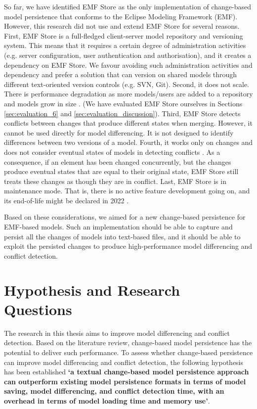 So far, we have identified EMF Store as the only implementation of change-based model persistence that conforms to the Eclipse Modeling Framework (EMF). However, this research did not use and extend EMF Store for several reasons. First, EMF Store is a full-fledged client-server model repository and versioning system. This means that it requires a certain degree of administration activities (e.g. server configuration, user authentication and authorisation), and it creates a dependency on EMF Store. We favour avoiding such administration activities and dependency and prefer a solution that can version on shared models through different text-oriented version controls (e.g. SVN, Git). Second, it does not scale. There is performance degradation as more models/users are added to a repository and models grow in size \cite{KolovosRMPGCLRV13}. (We have evaluated EMF Store ourselves in Sections \ref{sec:evaluation_6} and \ref{sec:evaluation_discussion}). Third, EMF Store detects conflicts between changes that produce different states when merging. However, it cannot be used directly for model differencing. It is not designed to identify differences between two versions of a model. Fourth, it works only on changes and does not consider eventual states of models in detecting conflicts \cite{DBLP:conf/sfm/BroschKLSWW12}. As a consequence, if an element has been changed concurrently, but the changes produce eventual states that are equal to their original state, EMF Store still treats these changes as though they are in conflict. Last, EMF Store is in maintenance mode. That is, there is no active feature development going on, and its end-of-life might be declared in 2022 \cite{emfstore2019what}.

Based on these considerations, we aimed for a new change-based persistence for EMF-based models. Such an implementation should be able to capture and persist all the changes of models into text-based files, and it should be able to exploit the persisted changes to produce high-performance model differencing and conflict detection.

\section{Hypothesis and Research Questions}
\label{sec:research_questions}
The research in this thesis aims to improve model differencing and conflict detection. Based on the literature review, change-based model persistence has the potential to deliver such performance. To assess whether change-based persistence can improve model differencing and conflict detection, the following hypothesis has been established \textbf{‘a textual change-based model persistence approach can outperform existing model persistence formats in terms of model saving, model differencing, and conflict detection time, with an overhead in terms of model loading time and memory use’}.


